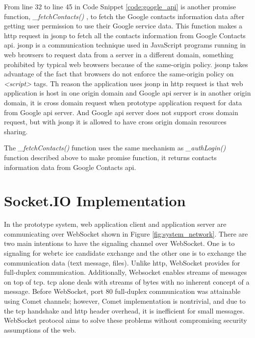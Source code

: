 \par From line 32 to line 45 in Code Snippet \ref{code:google_api} is another promise function, \textit{\_fetchContacts()} , to fetch the Google contacts information data after getting user permission to use their Google service data. This function makes a \gls{http} request in \gls{jsonp} to fetch all the contacts information from Google Contacts \gls{api}. \gls{jsonp} is a communication technique used in JavaScript programs running in web browsers to request data from a server in a different domain, something prohibited by typical web browsers because of the same-origin policy. \gls{jsonp} takes advantage of the fact that browsers do not enforce the same-origin policy on \textit{<script>} tags. Th reason the application uses \gls{jsonp} in \gls{http} request is that web application is host in one origin domain and Google \gls{api} server is in another origin domain, it is cross domain request when prototype application request for data from Google \gls{api} server. And Google \gls{api} server does not support cross domain request, but with \gls{jsonp} it is allowed to have cross origin domain resources sharing.

\par The \textit{\_fetchContacts()} function uses the same mechanism as \textit{\_authLogin()} function described above to make promise function, it returns contacts information data from Google Contacts \gls{api}.

\section{Socket.IO Implementation}

\noindent In the prototype system, web application client and application server are communicating over WebSocket shown in Figure \ref{fig:system_network}. There are two main intentions to have the signaling channel over WebSocket. One is to signaling for \gls{webrtc} \gls{ice} candidate exchange and the other one is to exchange the communication data (text message, files). Unlike \gls{http}, WebSocket provides for full-duplex communication. Additionally, Websocket enables streams of messages on top of \gls{tcp}. \gls{tcp} alone deals with streams of bytes with no inherent concept of a message. Before WebSocket, port 80 full-duplex communication was attainable using Comet channels; however, Comet implementation is nontrivial, and due to the \gls{tcp} handshake and \gls{http} header overhead, it is inefficient for small messages. WebSocket protocol aims to solve these problems without compromising security assumptions of the web.\cite{wiki:websocket}

